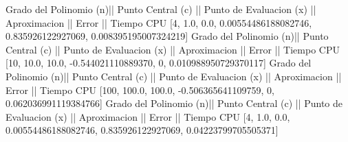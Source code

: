 Grado del Polinomio (n)|| Punto Central (c) || Punto de Evaluacion (x) || Aproximacion || Error || Tiempo CPU 
 [4, 1.0, 0.0, 0.00554486188082746, 0.835926122927069, 0.008395195007324219]
Grado del Polinomio (n)|| Punto Central (c) || Punto de Evaluacion (x) || Aproximacion || Error || Tiempo CPU 
 [10, 10.0, 10.0, -0.544021110889370, 0, 0.010988950729370117]
Grado del Polinomio (n)|| Punto Central (c) || Punto de Evaluacion (x) || Aproximacion || Error || Tiempo CPU 
 [100, 100.0, 100.0, -0.506365641109759, 0, 0.062036991119384766]
Grado del Polinomio (n)|| Punto Central (c) || Punto de Evaluacion (x) || Aproximacion || Error || Tiempo CPU 
 [4, 1.0, 0.0, 0.00554486188082746, 0.835926122927069, 0.04223799705505371]
